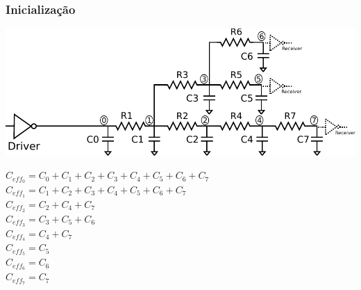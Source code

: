\documentclass[10pt,a4paper]{beamer}
\begin{document}
		\begin{frame}[t]
			\frametitle{Inicialização}
			\vspace{-0.25cm}
			\begin{center}
				\includegraphics[width=0.8\linewidth]{img/inicializacao1.pdf}
			\end{center}
			\vspace{0.25cm}
			$C_{eff_0} = C_0 + C_1 + C_2 + C_3 + C_4 + C_5 + C_6 + C_7$ \\
			$C_{eff_1} = C_1 + C_2 + C_3 + C_4 + C_5 + C_6 + C_7$ \\
			$C_{eff_2} = C_2 + C_4 + C_7$ \\
			$C_{eff_3} = C_3 + C_5 + C_6$ \\
			$C_{eff_4} = C_4 + C_7$ \\
			$C_{eff_5} = C_5$ \\
			$C_{eff_6} = C_6$ \\
			$C_{eff_7} = C_7$
		\end{frame}
\end{document}
